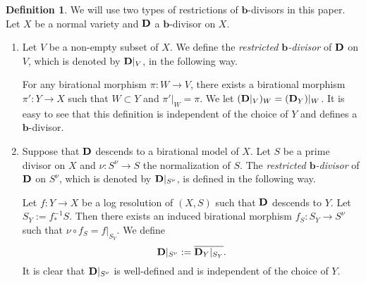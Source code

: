 \documentclass[11pt]{amsart}
\numberwithin{equation}{section}
\newcommand{\bb}{\bm{b}}
\newcommand{\Dd}{{\bf{D}}}
\theoremstyle{definition}
\newtheorem{defn}[thm]{Definition}
\theoremstyle{definition}
\theoremstyle{definition}
\begin{document}
\begin{defn}\label{defn: restriction b divisor}
We will use two types of restrictions of $\bb$-divisors in this paper. Let $X$ be a normal variety and $\Dd$ a $\bb$-divisor on $X$.
\begin{enumerate}
    \item Let $V$ be a non-empty subset of $X$.  We define the \emph{restricted $\bb$-divisor} of $\Dd$ on $V$, which is denoted by $\Dd|_{V}$, in the following way. 

    For any birational morphism $\pi: W\to V$, there exists a birational morphism $\pi': Y\rightarrow X$ such that $W\subset Y$ and $\pi'|_W=\pi$. We let $(\Dd|_V)_{W}=(\Dd_Y)|_W$. It is easy to see that this definition is independent of the choice of $Y$ and defines a $\bb$-divisor.
    \item Suppose that $\Dd$ descends to a birational model of $X$. Let $S$ be a prime divisor on $X$ and $\nu: S^\nu\rightarrow S$ the normalization of $S$. The \emph{restricted $\bb$-divisor} of $\Dd$ on $S^\nu$, which is denoted by $\Dd|_{S^\nu}$, is defined in the following way. 

     Let $f: Y\rightarrow X$ be a log resolution of $(X,S)$ such that $\Dd$ descends to $Y$. Let $S_Y:=f^{-1}_*S$. Then there exists an induced birational morphism $f_S: S_Y\rightarrow S^\nu$ such that $\nu\circ f_S=f|_{S_Y}$.
     We define $$\Dd|_{S^\nu}:=\overline{\Dd_Y|_{S_Y}}.$$
     It is clear that $\Dd|_{S^\nu}$ is well-defined and is independent of the choice of $Y$.
\end{enumerate}
\end{defn}
\end{document}
